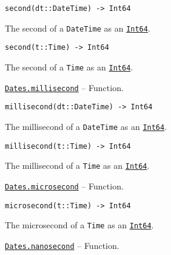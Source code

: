 \begin{adjustwidth}{2em}{0pt}


\begin{verbatim}
second(dt::DateTime) -> Int64
\end{verbatim}

The second of a \texttt{DateTime} as an \hyperlink{7720564657383125058}{\texttt{Int64}}.




\begin{lstlisting}
second(t::Time) -> Int64
\end{lstlisting}

The second of a \texttt{Time} as an \hyperlink{7720564657383125058}{\texttt{Int64}}.



\end{adjustwidth}
\hypertarget{4812831413693375163}{}
\hyperlink{4812831413693375163}{\texttt{Dates.millisecond}}  -- {Function.}

\begin{adjustwidth}{2em}{0pt}


\begin{verbatim}
millisecond(dt::DateTime) -> Int64
\end{verbatim}

The millisecond of a \texttt{DateTime} as an \hyperlink{7720564657383125058}{\texttt{Int64}}.




\begin{lstlisting}
millisecond(t::Time) -> Int64
\end{lstlisting}

The millisecond of a \texttt{Time} as an \hyperlink{7720564657383125058}{\texttt{Int64}}.



\end{adjustwidth}
\hypertarget{13472031808151614256}{}
\hyperlink{13472031808151614256}{\texttt{Dates.microsecond}}  -- {Function.}

\begin{adjustwidth}{2em}{0pt}


\begin{verbatim}
microsecond(t::Time) -> Int64
\end{verbatim}

The microsecond of a \texttt{Time} as an \hyperlink{7720564657383125058}{\texttt{Int64}}.



\end{adjustwidth}
\hypertarget{5077020706593048697}{}
\hyperlink{5077020706593048697}{\texttt{Dates.nanosecond}}  -- {Function.}

